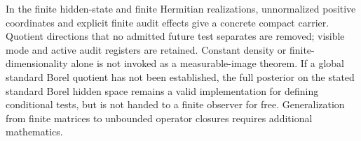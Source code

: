 In the finite hidden-state and finite Hermitian realizations, unnormalized positive coordinates and explicit finite audit effects give a concrete compact carrier. Quotient directions that no admitted future test separates are removed; visible mode and active audit registers are retained. Constant density or finite-dimensionality alone is not invoked as a measurable-image theorem. If a global standard Borel quotient has not been established, the full posterior on the stated standard Borel hidden space remains a valid implementation for defining conditional tests, but is not handed to a finite observer for free. Generalization from finite matrices to unbounded operator closures requires additional mathematics.
